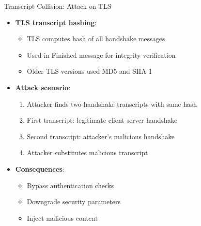 \documentclass[aspectratio=169, lualatex, handout]{beamer}
\begin{document}
\begin{frame}{Transcript Collision: Attack on TLS}
	\begin{itemize}[<+->]
		\item \textbf{TLS transcript hashing}:
		      \begin{itemize}
			      \item TLS computes hash of all handshake messages
			      \item Used in Finished message for integrity verification
			      \item Older TLS versions used MD5 and SHA-1
		      \end{itemize}
		\item \textbf{Attack scenario}:
		      \begin{enumerate}
			      \item Attacker finds two handshake transcripts with same hash
			      \item First transcript: legitimate client-server handshake
			      \item Second transcript: attacker's malicious handshake
			      \item Attacker substitutes malicious transcript
		      \end{enumerate}
		\item \textbf{Consequences}:
		      \begin{itemize}
			      \item Bypass authentication checks
			      \item Downgrade security parameters
			      \item Inject malicious content
		      \end{itemize}
	\end{itemize}
\end{frame}
\end{document}
